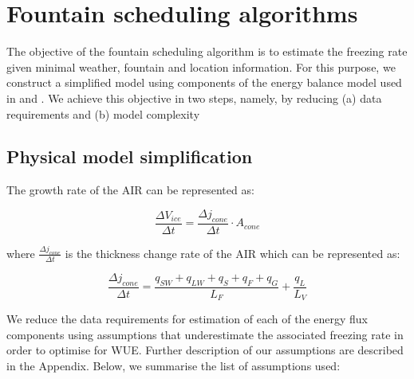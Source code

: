 \documentclass[utf8]{frontiersSCNS}
\begin{document}
\section{Fountain scheduling algorithms}

The objective of the fountain scheduling algorithm is to estimate the freezing rate given minimal weather,
fountain and location information. For this purpose, we construct a simplified model using components of the
energy balance model used in \cite{balasubramanianInfluenceMeteorologicalConditions2022} and
\cite{oerlemansBriefCommunicationGrowth2021}. We achieve this objective in two steps, namely, by reducing
(a) data requirements and (b) model complexity 

\subsection{Physical model simplification}
The growth rate of the AIR can be represented as: 

\begin{equation}
  \frac{\Delta V_{ice}}{\Delta t}  =  \frac{\Delta j_{cone}}{ \Delta t} \cdot A_{cone}
	\label{eqn:freeze}
\end{equation}

where $\frac{\Delta j_{cone}}{\Delta t}$ is the thickness change rate of the AIR which can be represented as: 

\begin{equation}
  \frac{\Delta j_{cone}}{\Delta t}  = \frac{q_{SW} + q_{LW} + q_{S} + q_{F} + q_{G}}{L_F} + \frac{q_{L}}{L_V} 
	\label{eqn:freeze}
\end{equation}

We reduce the data requirements for estimation of each of the energy flux components using assumptions that
underestimate the associated freezing rate in order to optimise for WUE. Further description of our assumptions
are described in the Appendix. Below, we summarise the list of assumptions used:
\end{document}
